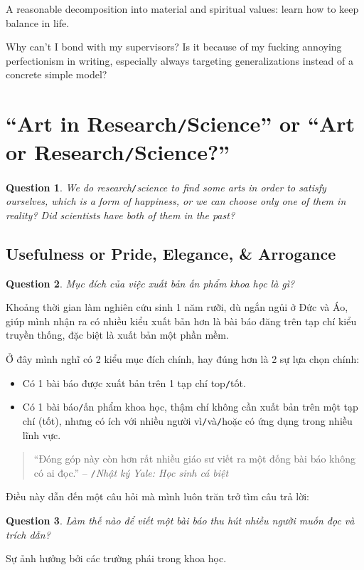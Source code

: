 \documentclass{article}
\numberwithin{equation}{section}
\newtheorem{ques}{Question}[section]
\begin{document}
A reasonable decomposition into material and spiritual values: learn how to keep balance in life.

Why can't I bond with my supervisors? Is it because of my fucking annoying perfectionism in writing, especially always targeting generalizations instead of a concrete simple model?

\section{``Art in Research\texttt{/}Science'' or ``Art or Research\texttt{/}Science?''}
\begin{ques}
	We do research\texttt{/}science to find some arts in order to satisfy ourselves, which is a form of happiness, or we can choose only one of them in reality? Did scientists have both of them in the past?
\end{ques}

\subsection{Usefulness or Pride, Elegance, \& Arrogance}
\begin{ques}
	Mục đích của việc xuất bản ấn phẩm khoa học là gì?
\end{ques}
Khoảng thời gian làm nghiên cứu sinh 1 năm rưỡi, dù ngắn ngủi ở Đức và Áo, giúp mình nhận ra có nhiều kiểu xuất bản hơn là bài báo đăng trên tạp chí kiểu truyền thống, đặc biệt là xuất bản một phần mềm.

Ở đây mình nghĩ có 2 kiểu mục đích chính, hay đúng hơn là 2 sự lựa chọn chính:
\begin{itemize}
	\item Có 1 bài báo được xuất bản trên 1 tạp chí top\texttt{/}tốt.
	\item Có 1 bài báo\texttt{/}ấn phẩm khoa học, thậm chí không cần xuất bản trên một tạp chí (tốt), nhưng có ích với nhiều người vì\texttt{/}và\texttt{/}hoặc có ứng dụng trong nhiều lĩnh vực.
\end{itemize}

\begin{quotation}
	``Đóng góp này còn hơn rất nhiều giáo sư viết ra một đống bài báo không có ai đọc.'' -- \cite{VHV's blog}\texttt{/}\textit{Nhật ký Yale: Học sinh cá biệt}
\end{quotation}
Điều này dẫn đến một câu hỏi mà mình luôn trăn trở tìm câu trả lời:
\begin{ques}
	Làm thế nào để viết một bài báo thu hút nhiều người muốn đọc và trích dẫn?
\end{ques}
Sự ảnh hưởng bởi các trường phái trong khoa học.
\end{document}
